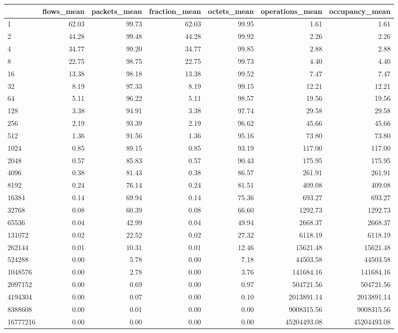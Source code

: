 \begin{tabular}{lrrrrrr}
\toprule
 & flows_mean & packets_mean & fraction_mean & octets_mean & operations_mean & occupancy_mean \\
\midrule
1 & 62.03 & 99.73 & 62.03 & 99.95 & 1.61 & 1.61 \\
2 & 44.28 & 99.48 & 44.28 & 99.92 & 2.26 & 2.26 \\
4 & 34.77 & 99.20 & 34.77 & 99.85 & 2.88 & 2.88 \\
8 & 22.75 & 98.75 & 22.75 & 99.73 & 4.40 & 4.40 \\
16 & 13.38 & 98.18 & 13.38 & 99.52 & 7.47 & 7.47 \\
32 & 8.19 & 97.33 & 8.19 & 99.15 & 12.21 & 12.21 \\
64 & 5.11 & 96.22 & 5.11 & 98.57 & 19.56 & 19.56 \\
128 & 3.38 & 94.91 & 3.38 & 97.74 & 29.58 & 29.58 \\
256 & 2.19 & 93.39 & 2.19 & 96.62 & 45.66 & 45.66 \\
512 & 1.36 & 91.56 & 1.36 & 95.16 & 73.80 & 73.80 \\
1024 & 0.85 & 89.15 & 0.85 & 93.19 & 117.00 & 117.00 \\
2048 & 0.57 & 85.83 & 0.57 & 90.43 & 175.95 & 175.95 \\
4096 & 0.38 & 81.43 & 0.38 & 86.57 & 261.91 & 261.91 \\
8192 & 0.24 & 76.14 & 0.24 & 81.51 & 409.08 & 409.08 \\
16384 & 0.14 & 69.94 & 0.14 & 75.36 & 693.27 & 693.27 \\
32768 & 0.08 & 60.39 & 0.08 & 66.60 & 1292.73 & 1292.73 \\
65536 & 0.04 & 42.99 & 0.04 & 49.94 & 2668.37 & 2668.37 \\
131072 & 0.02 & 22.52 & 0.02 & 27.32 & 6118.19 & 6118.19 \\
262144 & 0.01 & 10.31 & 0.01 & 12.46 & 15621.48 & 15621.48 \\
524288 & 0.00 & 5.78 & 0.00 & 7.18 & 44503.58 & 44503.58 \\
1048576 & 0.00 & 2.78 & 0.00 & 3.76 & 141684.16 & 141684.16 \\
2097152 & 0.00 & 0.69 & 0.00 & 0.97 & 504721.56 & 504721.56 \\
4194304 & 0.00 & 0.07 & 0.00 & 0.10 & 2013891.14 & 2013891.14 \\
8388608 & 0.00 & 0.01 & 0.00 & 0.00 & 9008315.56 & 9008315.56 \\
16777216 & 0.00 & 0.00 & 0.00 & 0.00 & 45204493.08 & 45204493.08 \\
\bottomrule
\end{tabular}
